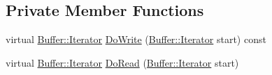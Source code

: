 \subsection*{Private Member Functions}
\begin{DoxyCompactItemize}
\item 
virtual \hyperlink{classns3_1_1Buffer_1_1Iterator}{Buffer\+::\+Iterator} \hyperlink{classns3_1_1OfdmDcdChannelEncodings_af90828c317b0f1372114b231cc160258}{Do\+Write} (\hyperlink{classns3_1_1Buffer_1_1Iterator}{Buffer\+::\+Iterator} start) const 
\item 
virtual \hyperlink{classns3_1_1Buffer_1_1Iterator}{Buffer\+::\+Iterator} \hyperlink{classns3_1_1OfdmDcdChannelEncodings_aeb468bf3215d835d6a8407d5d306c3ae}{Do\+Read} (\hyperlink{classns3_1_1Buffer_1_1Iterator}{Buffer\+::\+Iterator} start)
\end{DoxyCompactItemize}
